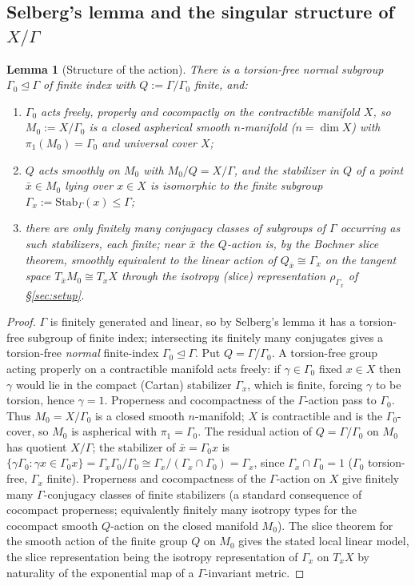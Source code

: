 \documentclass[12pt]{article}
\newtheorem{lemma}[theorem]{Lemma}
\theoremstyle{definition}
\begin{document}
\subsection{Selberg's lemma and the singular structure of $X/\Gamma$}

\begin{lemma}[Structure of the action]\label{lem:struct}
There is a torsion-free normal subgroup $\Gamma_0\trianglelefteq\Gamma$ of
finite index with $Q:=\Gamma/\Gamma_0$ finite, and:
\begin{enumerate}
\item $\Gamma_0$ acts freely, properly and cocompactly on the contractible
manifold $X$, so $M_0:=X/\Gamma_0$ is a closed aspherical smooth $n$-manifold
($n=\dim X$) with $\pi_1(M_0)=\Gamma_0$ and universal cover $X$;
\item $Q$ acts smoothly on $M_0$ with $M_0/Q=X/\Gamma$, and the stabilizer in
$Q$ of a point $\bar x\in M_0$ lying over $x\in X$ is isomorphic to the finite
subgroup $\Gamma_x:=\mathrm{Stab}_\Gamma(x)\le\Gamma$;
\item there are only finitely many conjugacy classes of subgroups of $\Gamma$
occurring as such stabilizers, each finite; near $\bar x$ the $Q$-action is, by
the Bochner slice theorem, smoothly equivalent to the linear action of
$Q_{\bar x}\cong\Gamma_x$ on the tangent space $T_{\bar x}M_0\cong T_xX$ through
the isotropy (slice) representation $\rho_{\Gamma_x}$ of \S\ref{sec:setup}.
\end{enumerate}
\end{lemma}
\begin{proof}
$\Gamma$ is finitely generated and linear, so by Selberg's lemma it has a
torsion-free subgroup of finite index; intersecting its finitely many conjugates
gives a torsion-free \emph{normal} finite-index $\Gamma_0\trianglelefteq\Gamma$.
Put $Q=\Gamma/\Gamma_0$. A torsion-free group acting properly on a contractible
manifold acts freely: if $\gamma\in\Gamma_0$ fixed $x\in X$ then $\gamma$ would
lie in the compact (Cartan) stabilizer $\Gamma_x$, which is finite, forcing
$\gamma$ to be torsion, hence $\gamma=1$. Properness and cocompactness of the
$\Gamma$-action pass to $\Gamma_0$. Thus $M_0=X/\Gamma_0$ is a closed smooth
$n$-manifold; $X$ is contractible and is the $\Gamma_0$-cover, so $M_0$ is
aspherical with $\pi_1=\Gamma_0$. The residual action of $Q=\Gamma/\Gamma_0$ on
$M_0$ has quotient $X/\Gamma$; the stabilizer of $\bar x=\Gamma_0 x$ is
$\{\gamma\Gamma_0:\gamma x\in\Gamma_0 x\}=\Gamma_x\Gamma_0/\Gamma_0\cong
\Gamma_x/(\Gamma_x\cap\Gamma_0)=\Gamma_x$, since $\Gamma_x\cap\Gamma_0=1$
($\Gamma_0$ torsion-free, $\Gamma_x$ finite). Properness and cocompactness of
the $\Gamma$-action on $X$ give finitely many $\Gamma$-conjugacy classes of
finite stabilizers (a standard consequence of cocompact properness; equivalently
finitely many isotropy types for the cocompact smooth $Q$-action on the closed
manifold $M_0$). The slice theorem for the smooth action of the finite group $Q$
on $M_0$ gives the stated local linear model, the slice representation being the
isotropy representation of $\Gamma_x$ on $T_xX$ by naturality of the exponential
map of a $\Gamma$-invariant metric.
\end{proof}
\end{document}
